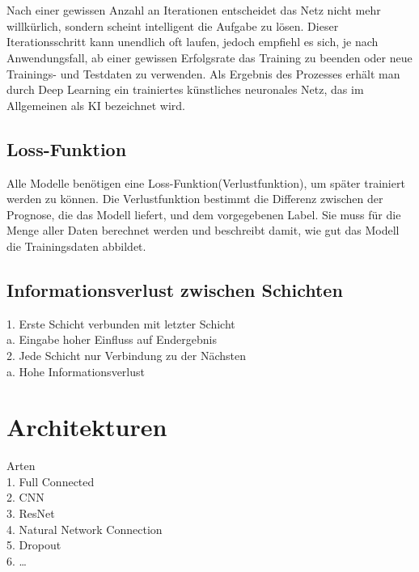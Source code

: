 \documentclass[12pt,oneside,a4paper,parskip]{scrbook}
\begin{document}
\\\\
Nach einer gewissen Anzahl an Iterationen entscheidet das Netz nicht mehr willkürlich, sondern scheint intelligent die Aufgabe zu lösen. Dieser Iterationsschritt kann unendlich oft laufen, jedoch empfiehl es sich, je nach Anwendungsfall, ab einer gewissen Erfolgsrate das Training zu beenden oder neue Trainings- und Testdaten zu verwenden. Als Ergebnis des Prozesses erhält man durch Deep Learning ein trainiertes künstliches neuronales Netz, das im Allgemeinen als KI bezeichnet wird.

\subsection{Loss-Funktion}
\label{section:lossFunction}

Alle Modelle benötigen eine Loss-Funktion(Verlustfunktion), um später trainiert werden zu können. Die Verlustfunktion bestimmt die Differenz zwischen der Prognose, die das Modell liefert, und dem vorgegebenen Label. Sie muss für die Menge aller Daten berechnet werden und beschreibt damit, wie gut das Modell die Trainingsdaten abbildet. 
\subsection{Informationsverlust zwischen Schichten}
1.	Erste Schicht verbunden mit letzter Schicht\\
	a.	Eingabe hoher Einfluss auf Endergebnis\\
2.	Jede Schicht nur Verbindung zu der Nächsten\\
	a.	Hohe Informationsverlust\\

\section{Architekturen}
Arten
\\1.	Full Connected
\\2.	CNN
\\3.	ResNet
\\4.	Natural Network Connection
\\5.	Dropout
\\6.	…
\end{document}
